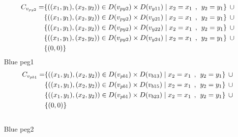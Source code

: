 \begin{align*}
C_{v_{py2}} = &\{((x_{1},y_{1}),(x_{2},y_{2}))\in D(v_{py2}) \times D(v_{y11})\mid x_{2} = x_{1} \hspace{1ex} , \hspace{1ex}  y_{2} = y_{1}\} \hspace{1ex} \cup 
\\& \{((x_{1},y_{1}),(x_{2},y_{2}))\in D(v_{py2}) \times D(v_{y21})\mid x_{2} = x_{1} \hspace{1ex} , \hspace{1ex}  y_{2} = y_{1}\} \hspace{1ex} \cup 
\\& \{ ((x_{1},y_{1}),(x_{2},y_{2}))\in D(v_{py2}) \times D(v_{y22})\mid x_{2} = x_{1} \hspace{1ex} , \hspace{1ex}  y_{2} = y_{1}\} \hspace{1ex} \cup 
\\&\{((x_{1},y_{1}),(x_{2},y_{2}))\in D(v_{py2}) \times D(v_{y24})\mid x_{2} = x_{1} \hspace{1ex} , \hspace{1ex}  y_{2} = y_{1}\} \hspace{1ex}\cup
\\& \{(0,0)\}
\end{align*}
 Blue peg1 
\begin{align*}
C_{v_{pb1}} = &\{((x_{1},y_{1}),(x_{2},y_{2}))\in D(v_{pb1}) \times D(v_{b13})\mid x_{2} = x_{1} \hspace{1ex} , \hspace{1ex}  y_{2} = y_{1}\} \hspace{1ex} \cup 
\\& \{((x_{1},y_{1}),(x_{2},y_{2}))\in D(v_{pb1}) \times D(v_{b15})\mid x_{2} = x_{1} \hspace{1ex} , \hspace{1ex}  y_{2} = y_{1}\} \hspace{1ex} \cup 
\\& \{ ((x_{1},y_{1}),(x_{2},y_{2}))\in D(v_{pb1}) \times D(v_{b23})\mid x_{2} = x_{1} \hspace{1ex} , \hspace{1ex}  y_{2} = y_{1}\} \hspace{1ex} \cup 
\\& \{(0,0)\}
\end{align*}
\\ Blue peg2
